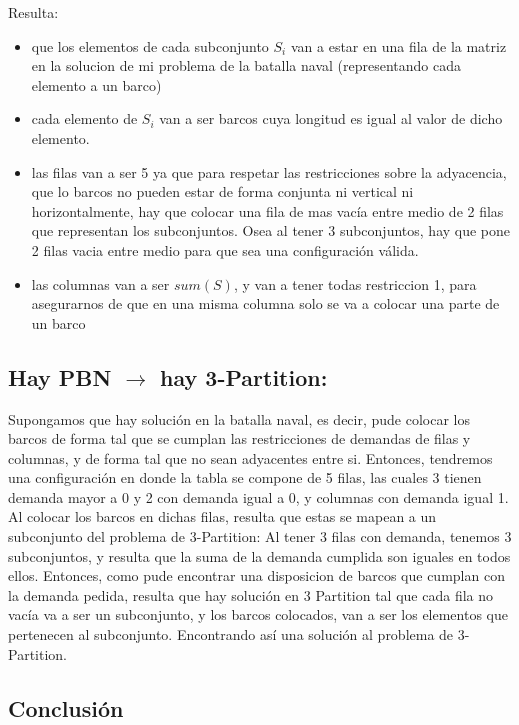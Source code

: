 Resulta: 

\begin{itemize}
    \item que los elementos de cada subconjunto $S_i$ van a estar en una fila de la matriz en la solucion de mi problema de la batalla naval (representando cada elemento a un barco)
    \item cada elemento de $S_i$ van a ser barcos cuya longitud es igual al valor de dicho elemento.
    \item las filas van a ser 5 ya que para respetar las restricciones sobre la adyacencia, que lo barcos no pueden estar de forma conjunta ni vertical ni horizontalmente, hay que colocar una fila de mas vacía entre medio de 2 filas que representan los subconjuntos. Osea al tener 3 subconjuntos, hay que pone  2 filas vacia entre medio para que sea una configuración válida.
    \item las columnas van a ser $sum(S)$, y van a tener todas restriccion 1, para asegurarnos de que en una misma columna solo se va a colocar una parte de un barco
\end{itemize}
    
\subsection{Hay PBN $\rightarrow$ hay 3-Partition:}

Supongamos que hay solución en la batalla naval, es decir, pude colocar los barcos de forma tal que se cumplan las restricciones de demandas de filas y columnas, y de forma tal que no sean adyacentes entre si.
Entonces, tendremos una configuración en donde la tabla se compone de 5 filas, las cuales 3 tienen demanda mayor a 0 y 2 con demanda igual a 0, y columnas con demanda igual 1.
Al colocar los barcos en dichas filas, resulta que estas se mapean a un subconjunto del problema de 3-Partition: Al tener 3 filas con demanda, tenemos 3 subconjuntos, y resulta 
que la suma de la demanda cumplida son iguales en todos ellos. Entonces, como pude encontrar una disposicion de barcos que cumplan con la demanda pedida, resulta que hay solución 
en 3 Partition tal que cada fila no vacía va a ser un subconjunto, y los barcos colocados, van a ser los elementos que pertenecen al subconjunto. Encontrando así 
una solución al problema de 3-Partition.

\subsection*{Conclusión}


